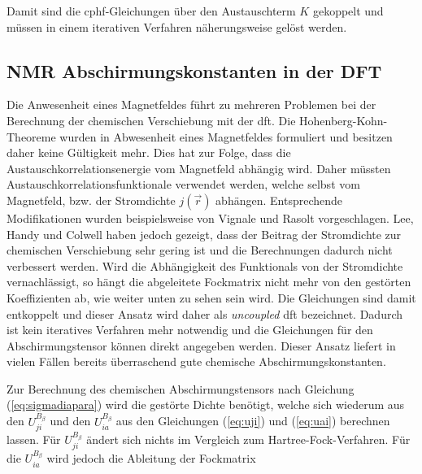     Damit sind die \ac{cphf}-Gleichungen über den Austauschterm $K$ gekoppelt und müssen in einem iterativen Verfahren näherungsweise gelöst werden.
    
\subsection{NMR Abschirmungskonstanten in der DFT}    
	Die Anwesenheit eines Magnetfeldes führt zu mehreren Problemen bei der Berechnung der chemischen Verschiebung mit der \ac{dft}. Die Hohenberg-Kohn-Theoreme wurden in Abwesenheit eines Magnetfeldes formuliert und besitzen daher keine Gültigkeit mehr.\supercite{rajagopal1973inhomogeneous,vignale1988current} Dies hat zur Folge, dass die Austauschkorrelationsenergie vom Magnetfeld abhängig wird.\supercite{buhl1999dft} Daher müssten Austauschkorrelationsfunktionale verwendet werden, welche selbst vom Magnetfeld, bzw. der Stromdichte $j(\vec{r})$ abhängen. Entsprechende Modifikationen wurden beispielsweise von Vignale und Rasolt vorgeschlagen.\supercite{vignale1988current,vignale1987density} Lee, Handy und Colwell \supercite{lee1995density} haben jedoch gezeigt, dass der Beitrag der Stromdichte zur chemischen Verschiebung sehr gering ist und die Berechnungen dadurch nicht verbessert werden. Wird die Abhängigkeit des Funktionals von der Stromdichte vernachlässigt, so hängt die abgeleitete Fockmatrix nicht mehr von den gestörten Koeffizienten ab, wie weiter unten zu sehen sein wird. Die Gleichungen sind damit entkoppelt und dieser Ansatz wird daher als \textit{uncoupled} \ac{dft} bezeichnet.\supercite{bieger1985lcao,malkin1993calculations} Dadurch ist kein iteratives Verfahren mehr notwendig und die Gleichungen für den Abschirmungstensor können direkt angegeben werden.  Dieser Ansatz liefert in vielen Fällen bereits überraschend gute chemische Abschirmungskonstanten.\supercite{buhl1999dft}
	
\bigskip
Zur Berechnung des chemischen Abschirmungstensors nach Gleichung (\ref{eq:sigmadiapara}) wird die gestörte Dichte benötigt, welche sich wiederum aus den $U_{ji}^{B_\beta}$ und den $U_{ia}^{B_\beta}$ aus den Gleichungen (\ref{eq:uji}) und (\ref{eq:uai}) berechnen lassen. Für $U_{ji}^{B_\beta}$ ändert sich nichts im Vergleich zum Hartree-Fock-Verfahren. Für die $U_{ia}^{B_\beta}$ wird jedoch die Ableitung der Fockmatrix 

